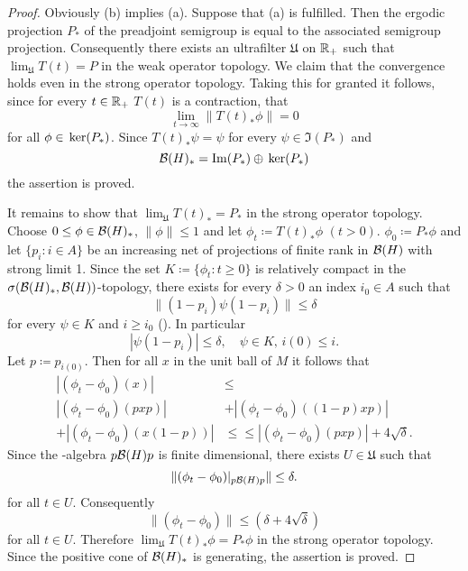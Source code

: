 \begin{proof}
Obviously (b) implies (a).
Suppose that (a) is fulfilled.
Then the ergodic projection $ P_{*} $  of the preadjoint semigroup is equal to the associated semigroup projection.
Consequently there exists an ultrafilter $ \mathfrak{U} $  on $ \mathbb{R}_{+} $  such that $ \lim_{\mathfrak{U}} T(t) = P $  in the weak operator topology.
We claim that the convergence holds even in the strong operator topology.
Taking this for granted it follows, since for every $ t \in \mathbb{R}_{+} $  $ T(t) $  is a contraction, that
\[
\lim_{t \to \infty} \|T(t)_{*}\phi\| = 0
\]
for all $ \phi \in \mathop{}\mathrm{ker}(P_{*}) $.
Since $ T(t)_{*}\psi = \psi $  for every 
$ \psi \in \Im (P_{*}) $  and
\[
\mathcal{B}(H)_{*} = \mathop{}\!\mathrm{Im} (P_{*}) \oplus \mathop{}\mathrm{ker}(P_{*})
\]
the assertion is proved.

It remains to show that $ \lim_{\mathfrak{U}} T(t)_{*} = P_{*} $  in the strong operator topology.
Choose $ 0 \leq \phi \in \mathcal{B}(H)_{*} $, $ \|\phi\| \leq 1 $  and let $ \phi_{t} \coloneqq T(t)_{*}\phi $  $ (t>0) $.
$ \phi_{0} \coloneqq P_{*}\phi $  and let $ \{p_{i}: i \in A\} $  be an increasing net of projections of finite rank in $ \mathcal{B}(H) $  with strong limit 1.
Since the set $ K \coloneqq \{\phi_{t}: t \geq 0\} $  is relatively compact in the $ \sigma(\mathcal{B}(H)_{*},\mathcal{B}(H)) $-topology, there exists for every $ \delta > 0 $  an index $ i_{0} \in A $  such that
\[
\|(1 - p_{i})\psi(1 - p_{i})\| \leq \delta
\]
for every $ \psi \in K $  and $ i \geq i_{0} $  (\citet[Theorem III.5.4.(vi)]{takesaki:1979}).
In particular
\[
|\psi(1 - p_{i})| \leq \delta, \quad \psi \in K,\, i(0) \leq i.
\]
Let $ p \coloneqq p_{i(0)} $.
Then for all $ x $  in the unit ball of $ M $  it follows that
\begin{align*}
|(\phi_{t} - \phi_{0})(x)| &\leq \\
|(\phi_{t} - \phi_{0})(pxp)| &+ |(\phi_{t} - \phi_{0})((1-p)xp)| \\
+ |(\phi_{t} - \phi_{0})(x(1-p))| &\leq 
\leq |(\phi_{t} - \phi_{0})(pxp)| + 4\sqrt{\delta} .
\end{align*}
Since the \WA-algebra $ p \mathcal{B}(H) p $  is finite dimensional, there exists $ U \in \mathfrak{U} $  such that
\[
	\|(\phi_{t} - \phi_{0})|_{p \mathcal{B}(H) p}\| \leq \delta .
\]
for all $ t \in U $.
Consequently
\[
\|(\phi_{t} - \phi_{0})\| \leq (\delta + 4\sqrt{\delta})
\]
for all $ t \in U $.
Therefore $ \lim_{\mathfrak{U}} T(t)_{*}\phi = P_{*}\phi $  in the strong operator topology.
Since the positive cone of $ \mathcal{B}(H)_{*} $  is generating, the assertion is proved.
\end{proof}
